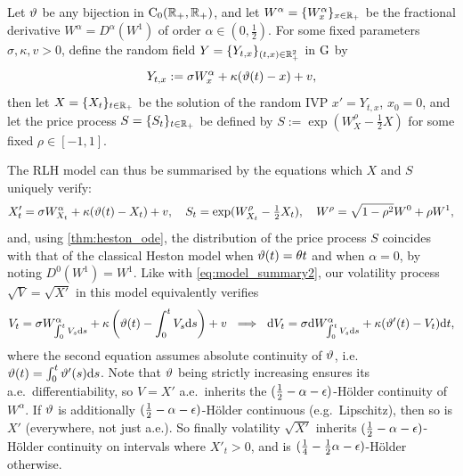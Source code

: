\begin{definition}\label{def:RLH_model}
    Let $\vartheta$ be any bijection in $\mathrm{C}_0(\mathbb{R}_+,\mathbb{R}_+)$, and let $W^\alpha=\{W^\alpha_x\}_{x\in\mathbb{R}_+}$ be the fractional derivative $W^\alpha=D^\alpha(W^1)$ of order $\alpha\in(0,\frac12)$. For some fixed parameters $\sigma,\kappa,v > 0$, define the random field $Y=\{Y_{t,x}\}_{(t,x)\in\mathbb{R}_+^2}$ in $\mathrm{G}$ by
    \begin{equation}\label{def:gen_hest_field3}
        Y_{t,x} := \sigma W^\alpha_x + \kappa(\vartheta(t) - x) + v,
    \end{equation}
    then let $X=\{X_t\}_{t\in\mathbb{R}_+}$ be the solution of the random IVP $x'=Y_{t,x}$, $x_0=0$, and let the price process $S=\{S_t\}_{t\in\mathbb{R}_+}$ be defined by $S:=\exp(W^\rho_{X}-\frac12 X)$ for some fixed $\rho\in[-1,1]$.
\end{definition}

The RLH model can thus be summarised by the equations which $X$ and $S$ uniquely verify:
\begin{equation}\label{eq:RLH_model_summary}
    X'_t = \sigma W^\alpha_{X_t} + \kappa(\vartheta(t) - X_t) + v,\quad S_t=\exp(W^\rho_{X_t}-\tfrac12 X_t),\quad W^\rho = \sqrt{1-\rho^2}W^0 + \rho W^1,
\end{equation}
and, using \autoref{thm:heston_ode}, the distribution of the price process $S$ coincides with that of the classical Heston model when $\vartheta(t) =  \theta t$ and when $\alpha=0$, by noting $D^0(W^1)=W^1$. Like with \autoref{eq:model_summary2}, our volatility process $\sqrt{V}=\sqrt{X'}$ in this model equivalently verifies
\begin{equation}\label{eq:RLH_model_summary2}
    V_t = \sigma W^\alpha_{\int_0^t V_s\mathrm{d} s} + \kappa\left(\vartheta(t) - \int_0^t V_s\mathrm{d} s\right) + v\ \implies\ \mathrm{d} V_t = \sigma \mathrm{d} W^\alpha_{\int_0^t V_s\mathrm{d} s} + \kappa(\vartheta'(t) - V_t)\mathrm{d} t,
\end{equation}
where the second equation assumes absolute continuity of $\vartheta$, i.e.~$\vartheta(t)=\int_0^t\vartheta'(s)\mathrm{d} s$. Note that $\vartheta$ being strictly increasing ensures its a.e.~differentiability, so $V=X'$ a.e.~inherits the $(\frac12-\alpha-\epsilon)$-H\"older continuity of $W^\alpha$. If $\vartheta$ is additionally $(\frac12-\alpha-\epsilon)$-H\"older continuous (e.g.~Lipschitz), then so is $X'$ (everywhere, not just a.e.). So finally volatility $\sqrt{X'}$ inherits $(\frac12-\alpha-\epsilon)$-H\"older continuity on intervals where $X'_t>0$, and is $(\frac14-\frac12\alpha - \epsilon)$-H\"older otherwise.

